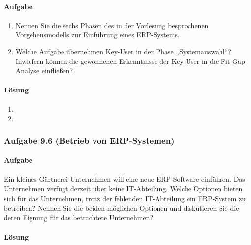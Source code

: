     \paragraph*{Aufgabe}
        \begin{enumerate}[label=\alph*)]
            \item Nennen Sie die sechs Phasen des in der Vorlesung besprochenen Vorgehensmodells zur Einführung eines ERP-Systems.
            \item Welche Aufgabe übernehmen Key-User in der Phase „Systemauswahl“? Inwiefern können die gewonnenen Erkenntnisse der Key-User in die Fit-Gap-Analyse einfließen?
        \end{enumerate}
    \paragraph*{Lösung}
        \begin{enumerate}[label=\alph*)]
            \item 
            \item 
        \end{enumerate}

\subsubsection*{Aufgabe 9.6 (Betrieb von ERP-Systemen)}
    \paragraph*{Aufgabe}
        Ein kleines Gärtnerei-Unternehmen will eine neue ERP-Software einführen. Das Unternehmen verfügt derzeit über keine IT-Abteilung. Welche Optionen bieten sich für das Unternehmen, trotz der fehlenden IT-Abteilung ein ERP-System zu betreiben? Nennen Sie die beiden möglichen Optionen und diskutieren Sie die deren Eignung für das betrachtete Unternehmen?
    \paragraph*{Lösung}
        